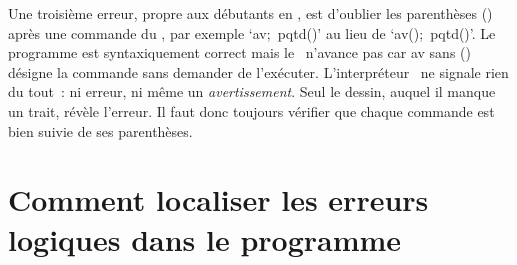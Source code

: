 Une troisième erreur, propre aux débutants en \python, est d'oublier les parenthèses 
{\idt ()} après une commande du \robot, par exemple `{\idt av;\ pqtd()}' au lieu de 
`{\idt av();\ pqtd()}'. Le programme est syntaxiquement correct mais le \robot\ n'avance pas 
car {\idt av} sans {\idt ()} désigne la commande sans demander de l'exécuter. 
L'interpréteur \python\ ne signale rien du tout~: ni erreur, ni même 
un {\em avertissement}. 
Seul le dessin, auquel il manque un trait, révèle l'erreur. Il faut donc toujours 
vérifier que chaque commande est bien suivie de ses parenthèses.

\section{Comment localiser les erreurs logiques dans le programme} 

